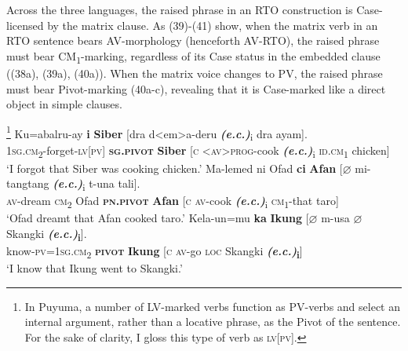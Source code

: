 \documentclass[10pt]{article}
\begin{document}
Across the three languages, the raised phrase in an RTO construction is Case-licensed by the matrix clause. As (39)-(41) show, when the matrix verb in an RTO sentence bears AV-morphology (henceforth AV-RTO), the raised phrase must bear CM\textsubscript{1}-marking, regardless of its Case status in the embedded clause ((38a), (39a), (40a)). When the matrix voice changes to PV, the raised phrase must bear Pivot-marking (40a-c), revealing that it is Case-marked like a direct object in simple clauses.  

 \begin{exe}
     \begin{xlist}
   \footnote{In Puyuma, a number of LV-marked verbs function as PV-verbs and select an internal argument, rather than a locative phrase, as the Pivot of the sentence. For the sake of clarity, I gloss this type of verb as \textsc{lv[pv]}.}
 		\gll Ku=abalru-ay \textbf{i} \textbf{Siber} [dra d<em>a-deru \textbf{\textit{(e.c.)}}\textsubscript{i} dra ayam].\\ 
\textsc{1sg.cm}\textsubscript{2}-forget-\textsc{lv[pv]}  {\textbf{\textsc{sg.pivot}}} \textbf{Siber} [\textsc{c} \textsc{<av>prog}-cook \textbf{\textit{(e.c.)}}\textsubscript{i}  \textsc{id.cm}\textsubscript{1} chicken]  \\
             \trans `I forgot that Siber was cooking chicken.'
 		\gll Ma-lemed ni Ofad \textbf{ci} \textbf{Afan} [$\varnothing$ mi-tangtang \textbf{\textit{(e.c.)}}\textsubscript{i} t-una tali].\\
             \textsc{av}-dream \textsc{cm}\textsubscript{2} Ofad {\textbf{\textsc{pn.pivot}}} \textbf{Afan} [\textsc{c} \textsc{av-}cook \textbf{\textit{(e.c.)}}\textsubscript{i} \textsc{cm}\textsubscript{1}-that taro]  \\
             \trans `Ofad dreamt that Afan cooked taro.'             
 		\gll Kela-un=mu \textbf{ka} \textbf{Ikung} [$\varnothing$ m-usa $\varnothing$ Skangki \textbf{\textit{(e.c.)}\textsubscript{i}}].\\
           know-\textsc{pv}=\textsc{1sg.cm}\textsubscript{2} \textbf{\textsc{pivot}} \textbf{Ikung} [\textsc{c} \textsc{av-}go \textsc{loc} Skangki \textbf{\textit{(e.c.)}\textsubscript{i}}]  \\
             \trans `I know that Ikung went to Skangki.'         
             \end{xlist}
             \end{exe}
\end{document}
